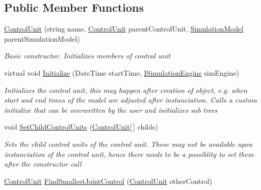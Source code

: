 \subsection*{Public Member Functions}
\begin{DoxyCompactItemize}
\item 
\hyperlink{class_simulation_core_1_1_h_c_c_m_elements_1_1_control_unit_a03b429dbcd272509795e1e21f61a3e36}{Control\+Unit} (string name, \hyperlink{class_simulation_core_1_1_h_c_c_m_elements_1_1_control_unit}{Control\+Unit} parent\+Control\+Unit, \hyperlink{class_simulation_core_1_1_simulation_classes_1_1_simulation_model}{Simulation\+Model} parent\+Simulation\+Model)
\begin{DoxyCompactList}\small\item\em Basic constructor. Initializes members of control unit \end{DoxyCompactList}\item 
virtual void \hyperlink{class_simulation_core_1_1_h_c_c_m_elements_1_1_control_unit_a4889fed46eb0abbdaef9bbf549f5d90a}{Initialize} (Date\+Time start\+Time, \hyperlink{interface_simulation_core_1_1_simulation_classes_1_1_i_simulation_engine}{I\+Simulation\+Engine} sim\+Engine)
\begin{DoxyCompactList}\small\item\em Initializes the control unit, this may happen after creation of object, e.\+g. when start and end times of the model are adjusted after instanciation. Calls a custom initialize that can be overwritten by the user and initializes sub trees \end{DoxyCompactList}\item 
void \hyperlink{class_simulation_core_1_1_h_c_c_m_elements_1_1_control_unit_aa4453098c9b87aaabd944d27c892bb34}{Set\+Child\+Control\+Units} (\hyperlink{class_simulation_core_1_1_h_c_c_m_elements_1_1_control_unit}{Control\+Unit}\mbox{[}$\,$\mbox{]} childs)
\begin{DoxyCompactList}\small\item\em Sets the child control units of the control unit. These may not be available upon instanciation of the control unit, hence there needs to be a possiblity to set them after the constructor call \end{DoxyCompactList}\item 
\hyperlink{class_simulation_core_1_1_h_c_c_m_elements_1_1_control_unit}{Control\+Unit} \hyperlink{class_simulation_core_1_1_h_c_c_m_elements_1_1_control_unit_a0ab106bafebb91d99816babe16006171}{Find\+Smallest\+Joint\+Control} (\hyperlink{class_simulation_core_1_1_h_c_c_m_elements_1_1_control_unit}{Control\+Unit} other\+Control)

\end{DoxyCompactItemize}
